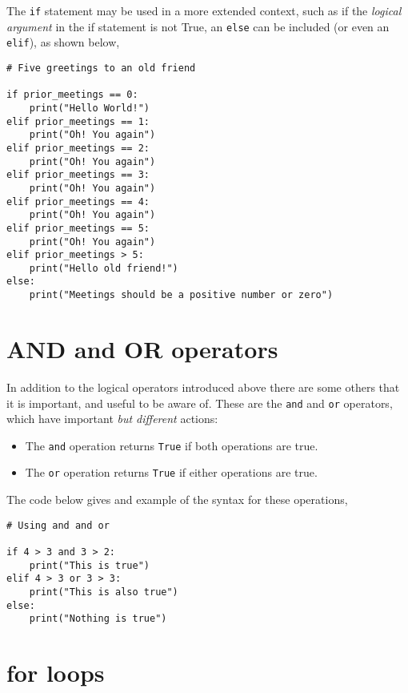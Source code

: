 \documentclass[a4paper]{article}
\begin{document}
The \texttt{if} statement may be used in a more extended context, such as if the \emph{logical argument} in the if statement is not True, an \texttt{else} can be included (or even an \texttt{elif}), as shown below,
\begin{lstlisting}
# Five greetings to an old friend

if prior_meetings == 0:
    print("Hello World!")
elif prior_meetings == 1:
    print("Oh! You again")
elif prior_meetings == 2:
    print("Oh! You again")
elif prior_meetings == 3:
    print("Oh! You again")
elif prior_meetings == 4:
    print("Oh! You again")
elif prior_meetings == 5:
    print("Oh! You again")
elif prior_meetings > 5:
	print("Hello old friend!")
else:
	print("Meetings should be a positive number or zero")
\end{lstlisting}

\section{AND and OR operators}

In addition to the logical operators introduced above there are some others that it is important, and useful to be aware of. 
These are the \texttt{and} and \texttt{or} operators, which have important \emph{but different} actions:
\begin{itemize}
	\item{The \texttt{and} operation returns \texttt{True} if both operations are true.}
	\item{The \texttt{or} operation returns \texttt{True} if either operations are true.}
\end{itemize}
The code below gives and example of the syntax for these operations, 
\begin{lstlisting}
# Using and and or

if 4 > 3 and 3 > 2:
	print("This is true")
elif 4 > 3 or 3 > 3:
	print("This is also true")
else:
	print("Nothing is true")
\end{lstlisting}
\vspace{\baselineskip}
\begin{center}
	\noindent{}
\end{center}

\section{for loops}

%
%
\end{document}
